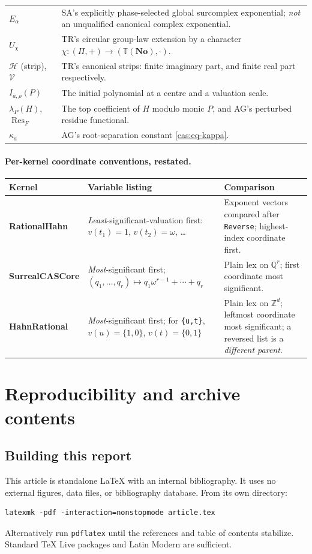 \documentclass[11pt,letterpaper]{article}
\numberwithin{equation}{section}
\theoremstyle{definition}
\theoremstyle{remark}
\newcommand{\No}{\mathbf{No}}
\newcommand{\Q}{\mathbb Q}
\newcommand{\Z}{\mathbb Z}
\newcommand{\HH}{\mathscr H}
\newcommand{\Res}{\operatorname{Res}}
\begin{document}
\begin{longtable}{@{}P{0.25\textwidth}P{0.68\textwidth}@{}}
$E_\alpha$ & SA's explicitly phase-selected global surcomplex exponential;
\emph{not} an unqualified canonical complex exponential.\\[0.3em]
$U_\chi$ & TR's circular group-law extension by a character
$\chi:(\Pi,+)\to(\mathbb T(\No),\cdot)$.\\[0.3em]
$\HH$ (strip), $\mathscr V$ & TR's canonical strips: finite imaginary part, and
finite real part respectively.\\[0.3em]
$I_{a,\rho}(P)$ & The initial polynomial at a centre and a valuation
scale.\\[0.3em]
$\lambda_P(H)$, $\Res_F$ & The top coefficient of $H$ modulo monic $P$, and AG's
perturbed residue functional.\\[0.3em]
$\kappa_a$ & AG's root-separation constant \eqref{cas:eq-kappa}.\\
\bottomrule
\end{longtable}
\endgroup

\paragraph{Per-kernel coordinate conventions, restated.}
\begingroup\small
\begin{longtable}{@{}P{0.20\textwidth}P{0.37\textwidth}P{0.37\textwidth}@{}}
\toprule
Kernel & Variable listing & Comparison\\
\midrule\endhead
\textbf{RationalHahn} & \emph{Least}-significant-valuation first:
$v(t_1)=1$, $v(t_2)=\omega$, \dots & Exponent vectors compared after
\texttt{Reverse}; highest-index coordinate first.\\[0.4em]
\textbf{SurrealCASCore} & \emph{Most}-significant first;
$(q_1,\dots,q_r)\mapsto q_1\omega^{r-1}+\cdots+q_r$ & Plain lex on $\Q^r$; first
coordinate most significant.\\[0.4em]
\textbf{HahnRational} & \emph{Most}-significant first; for \texttt{\{u,t\}},
$v(u)=\{1,0\}$, $v(t)=\{0,1\}$ & Plain lex on $\Z^d$; leftmost coordinate most
significant; a reversed list is a \emph{different parent}.\\
\bottomrule
\end{longtable}
\endgroup

\section{Reproducibility and archive contents}
\label{cas:app-repro}

\subsection{Building this report}
\label{cas:app-build}
This article is standalone LaTeX with an internal bibliography. It uses no
external figures, data files, or bibliography database. From its own directory:
\begin{lstlisting}
latexmk -pdf -interaction=nonstopmode article.tex
\end{lstlisting}
Alternatively run \texttt{pdflatex} until the references and table of contents
stabilize. Standard TeX Live packages and Latin Modern are sufficient.
\end{document}
